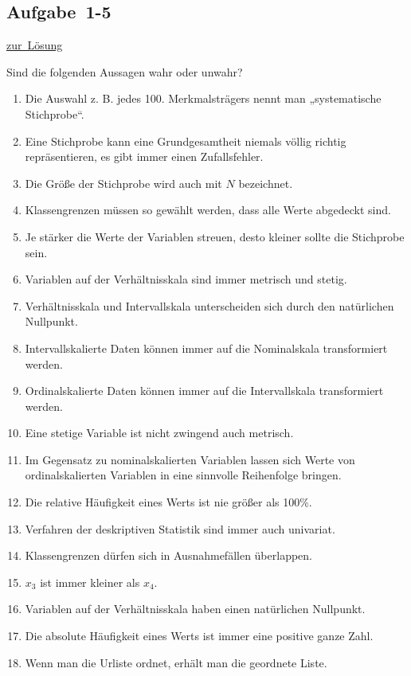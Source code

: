 \documentclass[
  11pt,
  ngerman,
  a4paper,
]{report}
\providecommand{\tightlist}{%
  \setlength{\itemsep}{0pt}\setlength{\parskip}{0pt}}
\begin{document}
\hypertarget{aufgabe-1-5}{%
\subsection{Aufgabe~1-5}\label{aufgabe-1-5}}

\protect\hyperlink{loesung-1-5}{zur~Lösung}

Sind die folgenden Aussagen wahr oder unwahr?

\begin{enumerate}
\def\labelenumi{\alph{enumi})}
\tightlist
\item
  Die Auswahl z. B. jedes 100. Merkmalsträgers nennt man „systematische Stichprobe``.
\item
  Eine Stichprobe kann eine Grundgesamtheit niemals völlig richtig repräsentieren, es gibt immer einen Zufallsfehler.
\item
  Die Größe der Stichprobe wird auch mit \(N\) bezeichnet.
\item
  Klassengrenzen müssen so gewählt werden, dass alle Werte abgedeckt sind.
\item
  Je stärker die Werte der Variablen streuen, desto kleiner sollte die Stichprobe sein.
\item
  Variablen auf der Verhältnisskala sind immer metrisch und stetig.
\item
  Verhältnisskala und Intervallskala unterscheiden sich durch den natürlichen Nullpunkt.
\item
  Intervallskalierte Daten können immer auf die Nominalskala transformiert werden.
\item
  Ordinalskalierte Daten können immer auf die Intervallskala transformiert werden.
\item
  Eine stetige Variable ist nicht zwingend auch metrisch.
\item
  Im Gegensatz zu nominalskalierten Variablen lassen sich Werte von ordinalskalierten Variablen in eine sinnvolle Reihenfolge bringen.
\item
  Die relative Häufigkeit eines Werts ist nie größer als 100\%.
\item
  Verfahren der deskriptiven Statistik sind immer auch univariat.
\item
  Klassengrenzen dürfen sich in Ausnahmefällen überlappen.
\item
  \(x_3\) ist immer kleiner als \(x_4\).
\item
  Variablen auf der Verhältnisskala haben einen natürlichen Nullpunkt.
\item
  Die absolute Häufigkeit eines Werts ist immer eine positive ganze Zahl.
\item
  Wenn man die Urliste ordnet, erhält man die geordnete Liste.
\end{enumerate}
\end{document}
